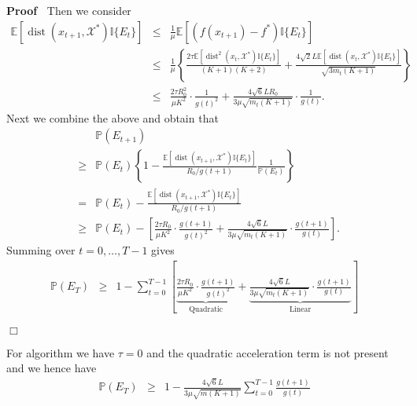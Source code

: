 \documentclass{article}
\newcommand{\cdummy}{\cdot}
\newcommand{\tmop}[1]{\ensuremath{\operatorname{#1}}}
\newcommand{\tmverbatim}[1]{\text{{\ttfamily{#1}}}}
\newenvironment{proof}{\noindent\textbf{Proof\ }}{\hspace*{\fill}$\Box$\medskip}
\begin{document}
\begin{proof}
  Then we consider
  \begin{eqnarray*}
    \mathbb{E} [\tmop{dist} (x_{t + 1}, \mathcal{X}^{\ast}) \mathbb{I} \{ E_t
    \}] & \leq & \frac{1}{\mu} \mathbb{E} [(f (x_{t + 1}) - f^{\ast})
    \mathbb{I} \{ E_t \}]\\
    & \leq & \frac{1}{\mu} \left\{ \frac{2 \tau \mathbb{E} [\tmop{dist}^2
    (x_t, \mathcal{X}^{\ast}) \mathbb{I} \{ E_t \}]}{(K + 1) (K + 2)} +
    \frac{4 \sqrt{2} L\mathbb{E} [\tmop{dist} (x_t, \mathcal{X}^{\ast})
    \mathbb{I} \{ E_t \}]}{\sqrt{3 m_t (K + 1)}} \right\}\\
    & \leq & \frac{2 \tau R_0^2}{\mu K^2} \cdummy \frac{1}{g (t)^2} + \frac{4
    \sqrt{6} L R_0}{3 \mu \sqrt{m_t  (K + 1)}} \cdummy \frac{1}{g (t)} .
  \end{eqnarray*}
  Next we combine the above and obtain that
  \begin{eqnarray*}
    &  & \mathbb{P} (E_{t + 1})\\
    & \geq & \mathbb{P} (E_t) \left\{ 1 - \frac{\mathbb{E} [\tmop{dist} (x_{t
    + 1}, \mathcal{X}^{\ast}) \mathbb{I} \{ E_t \}]}{R_0 / g (t + 1)}
    \frac{1}{\mathbb{P} (E_t)} \right\}\\
    & = & \mathbb{P} (E_t) - \frac{\mathbb{E} [\tmop{dist} (x_{t + 1},
    \mathcal{X}^{\ast}) \mathbb{I} \{ E_t \}]}{R_0 / g (t + 1)}\\
    & \geq & \mathbb{P} (E_t) - \left[ \frac{2 \tau R_0}{\mu K^2} \cdummy
    \frac{g (t + 1)}{g (t)^2} + \frac{4 \sqrt{6} L}{3 \mu \sqrt{m_t  (K + 1)}}
    \cdummy \frac{g (t + 1)}{g (t)} \right] .
  \end{eqnarray*}
  Summing over $t = 0, \ldots, T - 1$ gives
  \begin{eqnarray*}
    \mathbb{P} (E_T) & \geq & 1 - \sum_{t = 0}^{T - 1} \left[
    \underbrace{\frac{2 \tau R_0}{\mu K^2} \cdummy \frac{g (t + 1)}{g
    (t)^2}}_{\text{Quadratic}} + \underbrace{\frac{4 \sqrt{6} L}{3 \mu
    \sqrt{m_t (K + 1)}} \cdummy \frac{g (t + 1)}{g (t)}}_{\text{Linear}}
    \right]
  \end{eqnarray*}
  
\end{proof}

\begin{remark}
  For \tmverbatim{SPP} algorithm we have $\tau = 0$ and the quadratic
  acceleration term is not present and we hence have
  \begin{eqnarray*}
    \mathbb{P} (E_T) & \geq & 1 - \frac{4 \sqrt{6} L}{3 \mu \sqrt{m (K + 1)}}
    \sum_{t = 0}^{T - 1} \frac{g (t + 1)}{g (t)}
  \end{eqnarray*}
\end{remark}
\end{document}

